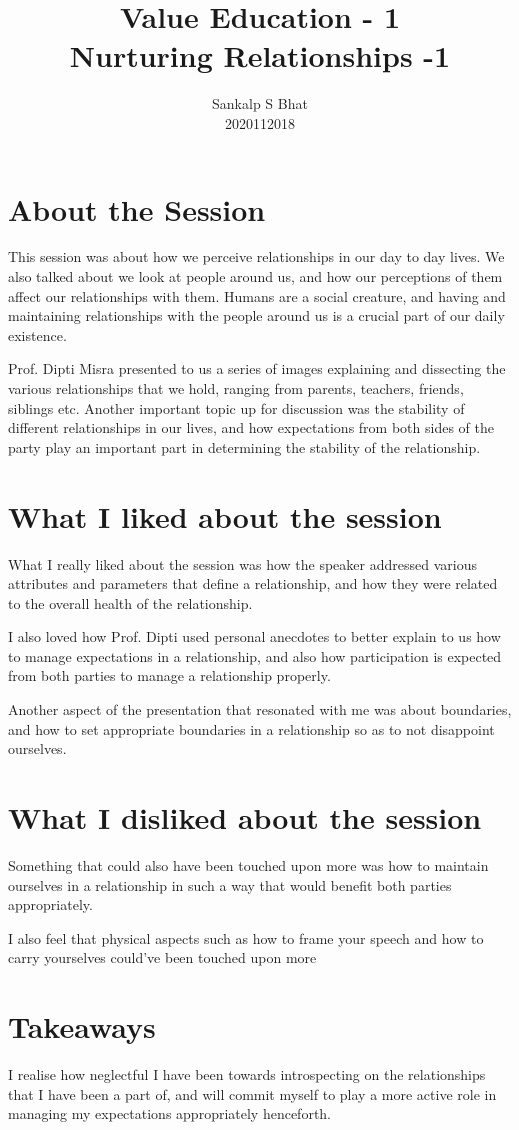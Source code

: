 \documentclass[a4paper, 12pt]{extarticle}
\title{Value Education - 1\\
Nurturing Relationships -1}
\author{Sankalp S Bhat\\
2020112018
}
\begin{document}
\maketitle
\thispagestyle{empty}

\section*{About the Session}
This session was about how we perceive relationships in our day to day lives. We also talked about we look at people around us, and how our perceptions of them affect our relationships with them. Humans are a social creature, and having and maintaining relationships with the people around us is a crucial part of our daily existence.

Prof. Dipti Misra presented to us a series of images explaining and dissecting the various relationships that we hold, ranging from parents, teachers, friends, siblings etc. Another important topic up for discussion was the stability of different relationships in our lives, and how expectations from both sides of the party play an important part in determining the stability of the relationship. 
      
\section*{What I liked about the session}

What I really liked about the session was how the speaker addressed various attributes and parameters that define a relationship, and how they were related to the overall health of the relationship.
    
I also loved how Prof. Dipti used personal anecdotes to better explain to us how to manage expectations in a relationship, and also how participation is expected from both parties to manage a relationship properly.

Another aspect of the presentation that resonated with me was about boundaries, and how to set appropriate boundaries in a relationship so as to not disappoint ourselves.
     
 \section*{What I disliked about the session}
 
Something that could also have been touched upon more was how to maintain ourselves in a relationship in such a way that would benefit both parties appropriately.

I also feel that physical aspects such as how to frame your speech and how to carry yourselves could've been touched upon more
 \section*{Takeaways}
    
I realise how neglectful I have been towards introspecting on the relationships that I have been a part of, and will commit myself to play a more active role in managing my expectations appropriately henceforth.
\end{document}
